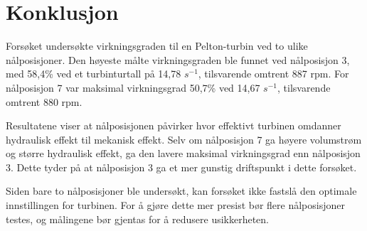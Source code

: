 \newpage
\section*{Konklusjon}

Forsøket undersøkte virkningsgraden til en Pelton-turbin ved to ulike nålposisjoner. Den høyeste målte virkningsgraden ble funnet ved nålposisjon 3, med 58,4\% ved et turbinturtall på 14,78 $s^{-1}$, tilsvarende omtrent 887 rpm. For nålposisjon 7 var maksimal virkningsgrad 50,7\% ved 14,67 $s^{-1}$, tilsvarende omtrent 880 rpm.

Resultatene viser at nålposisjonen påvirker hvor effektivt turbinen omdanner hydraulisk effekt til mekanisk effekt. Selv om nålposisjon 7 ga høyere volumstrøm og større hydraulisk effekt, ga den lavere maksimal virkningsgrad enn nålposisjon 3. Dette tyder på at nålposisjon 3 ga et mer gunstig driftspunkt i dette forsøket.

Siden bare to nålposisjoner ble undersøkt, kan forsøket ikke fastslå den optimale innstillingen for turbinen. For å gjøre dette mer presist bør flere nålposisjoner testes, og målingene bør gjentas for å redusere usikkerheten.
